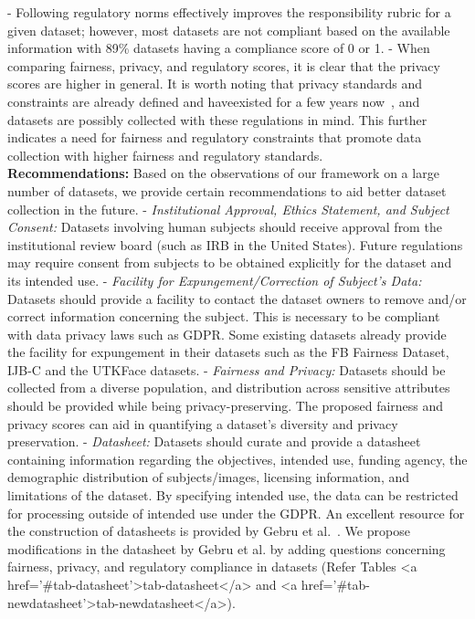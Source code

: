 \documentclass[journal]{IEEEtran}
\begin{document}
-  Following regulatory norms effectively improves the responsibility rubric for a given dataset; however, most datasets are not compliant based on the available information with 89\% datasets having a compliance score of 0 or 1.
-  When comparing fairness, privacy, and regulatory scores, it is clear that the privacy scores are higher in general. It is worth noting that privacy standards and constraints are already defined and haveexisted for a few years now~\cite{regulation2016regulation}, and datasets are possibly collected with these regulations in mind. This further indicates a need for fairness and regulatory constraints that promote data collection with higher fairness and regulatory standards.\\

\noindent \textbf{Recommendations:} Based on the observations of our framework on a large number of datasets, we provide certain recommendations to aid better dataset collection in the future.
-  \textit{Institutional Approval, Ethics Statement, and Subject Consent:} Datasets involving human subjects should receive approval from the institutional review board (such as IRB in the United States). Future regulations may require consent from subjects to be obtained explicitly for the dataset and its intended use.
-  \textit{Facility for Expungement/Correction of Subject's Data:} Datasets should provide a facility to contact the dataset owners to remove and/or correct information concerning the subject. This is necessary to be compliant with data privacy laws such as GDPR. Some existing datasets already provide the facility for expungement in their datasets such as the FB Fairness Dataset, IJB-C and the UTKFace datasets.
-  \textit{Fairness and Privacy:} Datasets should be collected from a diverse population, and distribution across sensitive attributes should be provided while being privacy-preserving. The proposed fairness and privacy scores can aid in quantifying a dataset's diversity and privacy preservation.
-  \textit{Datasheet:} Datasets should curate and provide a datasheet containing information regarding the objectives, intended use, funding agency, the demographic distribution of subjects/images, licensing information, and limitations of the dataset. By specifying intended use, the data can be restricted for processing outside of intended use under the GDPR. An excellent resource for the construction of datasheets is provided by Gebru et al.~\cite{gebru2021datasheets}. We propose modifications in the datasheet by Gebru et al. by adding questions concerning fairness, privacy, and regulatory compliance in datasets (Refer Tables <a href='#tab-datasheet'>tab-datasheet</a> and <a href='#tab-newdatasheet'>tab-newdatasheet</a>).
\end{document}
